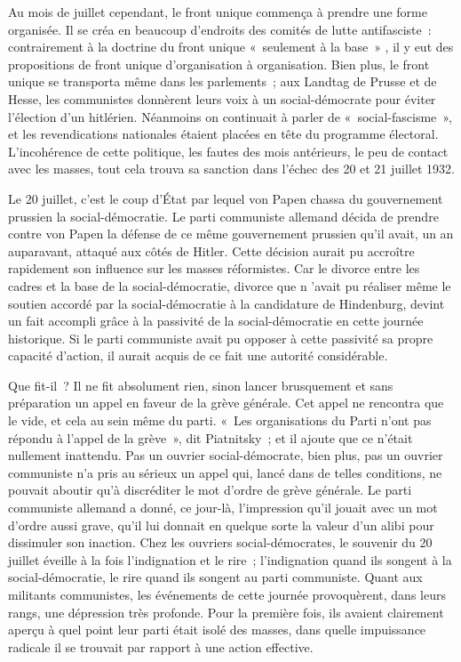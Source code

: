 \documentclass[french,twoside]{book} %
\begin{document}
Au mois de juillet cependant, le front unique commença à prendre une forme organisée. Il se créa en beaucoup d'endroits des comités de lutte anti­fasciste : contrairement à la doctrine du front unique « seulement à la base » , il y eut des propositions de front unique d'organisation à organisation. Bien plus, le front unique se transporta même dans les parlements ; aux Landtag de Prusse et de Hesse, les communistes donnèrent leurs voix à un social-démo­crate pour éviter l'élection d'un hitlérien. Néanmoins on continuait à parler de « social-fascisme », et les revendications nationales étaient placées en tête du programme électoral. L'incohérence de cette politique, les fautes des mois antérieurs, le peu de contact avec les masses, tout cela trouva sa sanction dans l'échec des 20 et 21 juillet 1932.\par
Le 20 juillet, c'est le coup d'État par lequel von Papen chassa du gouvernement prussien la social-démocratie. Le parti communiste allemand décida de prendre contre von Papen la défense de ce même gouvernement prussien qu'il avait, un an auparavant, attaqué aux côtés de Hitler. Cette déci­sion aurait pu accroître rapidement son influence sur les masses réformistes. Car le divorce entre les cadres et la base de la social-démocratie, divorce que n 'avait pu réaliser même le soutien accordé par la social-démocratie à la candidature de Hindenburg, devint un fait accompli grâce à la passivité de la social-démocratie en cette journée historique. Si le parti communiste avait pu opposer à cette passivité sa propre capacité d'action, il aurait acquis de ce fait une autorité considérable.\par
Que fit-il ? Il ne fit absolument rien, sinon lancer brusquement et sans préparation un appel en faveur de la grève générale. Cet appel ne rencontra que le vide, et cela au sein même du parti. « Les organisations du Parti n'ont pas répondu à l'appel de la grève », dit Piatnitsky ; et il ajoute que ce n'était nullement inattendu. Pas un ouvrier social-démocrate, bien plus, pas un ouvrier communiste n'a pris au sérieux un appel qui, lancé dans de telles conditions, ne pouvait aboutir qu'à discréditer le mot d'ordre de grève géné­rale. Le parti communiste allemand a donné, ce jour-là, l'impression qu'il jouait avec un mot d'ordre aussi grave, qu'il lui donnait en quelque sorte la valeur d'un alibi pour dissimuler son inaction. Chez les ouvriers social-démocrates, le souvenir du 20 juillet éveille à la fois l'indignation et le rire ; l'indignation quand ils songent à la social-démocratie, le rire quand ils songent au parti communiste. Quant aux militants communistes, les événements de cette journée provoquèrent, dans leurs rangs, une dépression très profonde. Pour la première fois, ils avaient clairement aperçu à quel point leur parti était isolé des masses, dans quelle impuissance radicale il se trouvait par rapport à une action effective.\par
\end{document}
